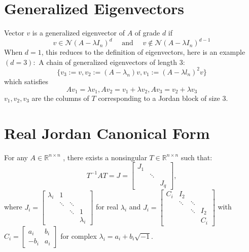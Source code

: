 \documentclass[10pt,a4paper,oneside]{article}
\begin{document}
\section{Generalized Eigenvectors}
Vector $v$ is a generalized eigenvector of $A$ of grade $d$ if
\[
v \in \mathcal{N}(A-\lambda I_n)^{d} \quad \text { and } \quad v \notin \mathcal{N}(A-\lambda I_n)^{d-1}
\]
When $d=1$, this reduces to the definition of eigenvectors, here is an example $(d=3) :$ A chain of generalized eigenvectors of length 3:
\[
\{v_{3} :=v, v_{2} :=\left(A-\lambda_{n}\right) v, v_{1} :=\left(A-\lambda l_{n}\right)^{2} v\}
\]
which satisfies
\[
A v_{1}=\lambda v_{1}, A v_{2}=v_{1}+\lambda v_{2}, A v_{3}=v_{2}+\lambda v_{3}
\]
$v_{1}, v_{2}, v_{3}$ are the columns of $T$ corresponding to a Jordan block of size 3.

\section{Real Jordan Canonical Form}
For any $A \in \mathbb{R}^{n \times n}$ , there exists a nonsingular $T \in \mathbb{R}^{n \times n}$ such that:
\[
T^{-1} A T=J=\left[\begin{array}{ccc}{J_{1}} \\ {} & {\ddots} \\ {} & {} &{} {J_{q}}\end{array}\right],
\]
where $J_{i}=\left[\begin{array}{cccc}{\lambda_{i}} & {1} & {} & {} \\ {} & {\ddots} & {\ddots} & {} \\ {} & {} & {\ddots} & {1} \\ {} & {} & {} & {\lambda_{i}}\end{array}\right]$ for real $\lambda_i$ and $J_{i}=\left[\begin{array}{cccc}{C_{i}} & {I_{2}} & {} & {} \\ {} & {\ddots} & {\ddots} & {} \\ {} & {} & {\ddots} & {I_{2}} \\ {} & {} & {} & {C_{i}}\end{array}\right]$ with $C_{i}=\left[\begin{array}{ll}{a_{i}} & {b_{i}} \\ {-b_{i}} & {a_{i}}\end{array}\right]$ for complex $\lambda_{i}=a_{i}+b_{i} \sqrt{-1}$.
\end{document}
